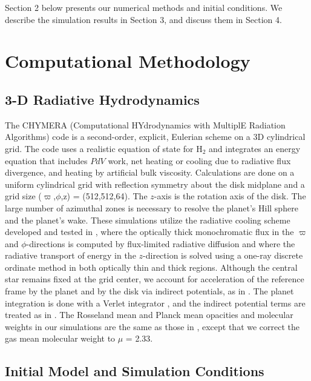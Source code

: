 \documentclass[12pt,manuscript,authoryear]{aastex}
\begin{document}
Section 2 below presents our numerical methods and initial conditions.  We describe the simulation results in Section 3, and discuss them in Section 4.  

\section{Computational Methodology}

\subsection{3-D Radiative Hydrodynamics}

The CHYMERA (Computational HYdrodynamics with MultiplE Radiation Algorithms) code \citep{boley2007b} is a second-order, explicit, Eulerian scheme on a 3D cylindrical grid. The code uses a realistic equation of state for H$_2$ \citep{boley2007} and integrates an energy equation that includes $PdV$ work, net heating or cooling due to radiative flux divergence, and heating by artificial bulk viscosity. Calculations are done on a uniform cylindrical grid with reflection symmetry about the disk midplane and a grid size ($\varpi$,$\phi$,z) = (512,512,64). 
The $z$-axis is the rotation axis of the disk. The large number of azimuthal zones is necessary to resolve the planet's Hill sphere and the planet's wake. These simulations utilize the radiative cooling scheme developed and tested in \citet{boley2007b}, where the optically thick monochromatic flux in the $\varpi$ and $\phi$-directions is computed by flux-limited radiative diffusion and where the radiative transport of energy in the $z$-direction is solved using a one-ray discrete ordinate method in both optically thin and thick regions. Although the central star remains fixed at the grid center, we account for acceleration of the reference frame by the planet and by the disk via indirect potentials, as in \citet{michael2010}. The planet integration is done with a Verlet integrator \citep[e.g.,][]{hut1995}, and the indirect potential terms are treated as in \citet{nelson2000a}. The Rosseland mean and Planck mean opacities and molecular weights in our simulations are the same as those in \citet{boley2006,boley2007b}, except that we correct the \citet{dalessio2001} gas mean molecular weight to $\mu$ = 2.33.

\subsection{Initial Model and Simulation Conditions}
\end{document}
